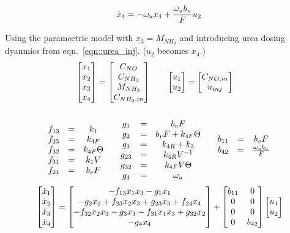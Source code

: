 \begin{equation}{\label{eqn::urea_inj}}
    \dot x_4 = - \omega_u x_4 +   \frac{\omega_u b_u}{F} u_{2}
\end{equation}

Using the parameetric model with $x_3 = M_{NH_3}$ and introducing urea dosing
dyanmics from eqn.~\ref{eqn::urea_inj}. ($u_2$ becomes $x_4$.)
\begin{align*}
    \begin{bmatrix} x_1 \\ x_2 \\ x_3 \\ x_4 \end{bmatrix} = \begin{bmatrix} C_{NO} \\ C_{NH_3} \\ M_{NH_3} \\ C_{NH_3, in} \end{bmatrix} \qquad &
    \begin{bmatrix} u_1 \\ u_2  \end{bmatrix} = \begin{bmatrix} C_{NO, in} \\ u_{inj} \end{bmatrix}
\end{align*}
\begin{align*}
    \begin{matrix} 
    \\f_{13} &=& k_1
    \\f_{23} &=& k_{4F}
    \\f_{32} &=& k_{4F} \Theta
    \\f_{31} &=& k_1 V
    \\f_{24} &=& b_v F
     \end{matrix}
    \qquad
    \begin{matrix} 
    \\ g_1    &=& b_v F
    \\ g_2    &=& b_v F + k_{4F} \Theta
    \\ g_{3}  &=& k_{4R}+k_3
    \\ g_{23} &=& k_{4R} V^{-1}
    \\ g_{32} &=& k_{4F} V \Theta
    \\ g_4 &=& \omega_u
     \end{matrix}
    \qquad
    \begin{matrix} 
        b_{11} &=& b_v F
        \\
        b_{42} &=& \frac{\omega_u b_u}{F}
     \end{matrix}
\end{align*}
\begin{equation}{\label{eqn::full_nonlinear}}
     \begin{bmatrix} \dot x_1 \\
        \dot x_2\\
        \dot x_3\\
        \dot x_4 \end{bmatrix} =
    \begin{bmatrix} 
        -f_{13} x_1 x_3
        -g_1 x_1
        \\
        -g_2 x_2
        + f_{23} x_2 x_3
        + g_{23} x_3
        + f_{24} x_4
        \\
        -f_{32} x_2 x_3
        -g_3 x_3
        -f_{31} x_1 x_3
        + g_{32} x_2
        \\
        -g_4 x_4
     \end{bmatrix}
    + \begin{bmatrix} b_{11} & 0\\
          0     & 0\\
          0     & 0\\
          0     & b_{42}   \end{bmatrix}\begin{bmatrix} u_1 \\ u_2  \end{bmatrix}
\end{equation}


